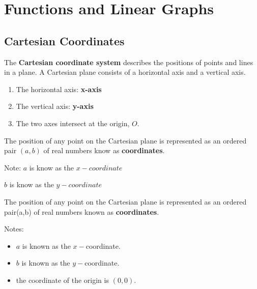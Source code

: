 \documentclass[../main]{subfiles}
\begin{document}
\section{Functions and Linear Graphs}

\subsection{Cartesian Coordinates}

The \textbf{Cartesian coordinate system} describes the positions of points and
lines in a plane. A Cartesian plane consists of a horizontal axis and a vertical
axis.
\begin{enumerate}
\item The horizontal axis: \textbf{x-axis}
\item  The vertical axis: \textbf{y-axis}
\item The two axes intersect at the origin, \(O\).

\end{enumerate}

The position of any point on the Cartesian plane is represented as an ordered
pair \((a,b)\) of real numbers know as \textbf{coordinates}.

Note:
\(a\) is know as the \(x-coordinate\)

\(b\) is know as the \(y-coordinate\)


The position of any point on the Cartesian plane is represented as an ordered
pair(a,b) of real numbers known as \textbf{coordinates}.


Notes:
\begin{itemize}
\item \(a\) is known as the \(x-\)coordinate.
\item \(b\) is known as the \(y-\)coordinate.
\item the coordinate of the origin is \((0,0)\).
\end{itemize}
  
\end{document}
